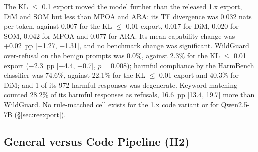 The KL $\le$ 0.1 export moved the model further than the released 1.x export, DiM and SOM but less than MPOA and
ARA: its TF divergence was 0.032 nats per token, against 0.007 for the KL $\le$ 0.01 export, 0.017 for DiM, 0.020 for SOM,
0.042 for MPOA and 0.077 for ARA. Its mean capability change was +0.02~pp [$-$1.27, +1.31], and no benchmark change
was significant. WildGuard over-refusal on the benign prompts was 0.0\%, against 2.3\% for the KL $\le$ 0.01 export
($-$2.3~pp [$-$4.4, $-$0.7], $p=0.008$); harmful compliance by the HarmBench classifier was 74.6\%, against 22.1\%
for the KL $\le$ 0.01 export and 40.3\% for DiM; and 1 of its 972 harmful responses was degenerate. Keyword matching
counted 28.2\% of its harmful responses as refusals, 16.6~pp [13.4, 19.7] more than WildGuard. No rule-matched cell
exists for the 1.x code variant or for Qwen2.5-7B (\S\ref{sec:reexport}).

\subsection{General versus Code Pipeline (H2)}

